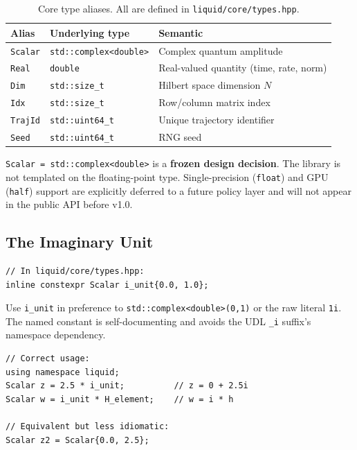 \documentclass[11pt,a4paper,twoside]{book}
\newcommand{\code}[1]{\texttt{\small#1}}
\theoremstyle{definition}
\theoremstyle{remark}
\begin{document}
\begin{table}[H]
\centering
\caption{Core type aliases. All are defined in \code{liquid/core/types.hpp}.}
\label{tab:core-types}
\begin{tabularx}{\linewidth}{L{22mm}L{38mm}X}
\toprule
\textbf{Alias} & \textbf{Underlying type} & \textbf{Semantic} \\
\midrule
\code{Scalar}  & \code{std::complex<double>} & Complex quantum amplitude \\
\code{Real}    & \code{double}               & Real-valued quantity (time, rate, norm) \\
\code{Dim}     & \code{std::size\_t}         & Hilbert space dimension $N$ \\
\code{Idx}     & \code{std::size\_t}         & Row/column matrix index \\
\code{TrajId}  & \code{std::uint64\_t}       & Unique trajectory identifier \\
\code{Seed}    & \code{std::uint64\_t}       & RNG seed \\
\bottomrule
\end{tabularx}
\end{table}

\begin{invbox}
  \code{Scalar = std::complex<double>} is a \textbf{frozen design decision}.
  The library is not templated on the floating-point type.
  Single-precision (\code{float}) and GPU (\code{half}) support are
  explicitly deferred to a future policy layer and will not appear
  in the public API before v1.0.
\end{invbox}

\subsection{The Imaginary Unit}
\label{subsec:i-unit}

\begin{verbatim}
// In liquid/core/types.hpp:
inline constexpr Scalar i_unit{0.0, 1.0};
\end{verbatim}

Use \code{i\_unit} in preference to \code{std::complex<double>(0,1)}
or the raw literal \code{1i}. The named constant is self-documenting
and avoids the UDL \code{\_i} suffix's namespace dependency.

\begin{verbatim}
// Correct usage:
using namespace liquid;
Scalar z = 2.5 * i_unit;          // z = 0 + 2.5i
Scalar w = i_unit * H_element;    // w = i * h

// Equivalent but less idiomatic:
Scalar z2 = Scalar{0.0, 2.5};
\end{verbatim}
\end{document}
